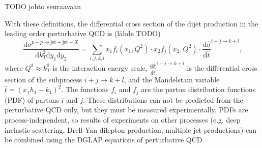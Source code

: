 \documentclass[a4paper, twoside, english, 12pt]{article}
\begin{document}
TODO johto seuraavaan

With these definitions, the differential cross section of the dijet production in the leading order perturbative QCD is (lähde TODO)
\begin{equation}\label{E:dijet_cross_section}
\frac{\text{d}\sigma^{p+p\rightarrow\text{jet}+\text{jet}+X}}{\text{d}k_T^2\text{d}y_1\text{d}y_2} = \sum_{i,j,k,l} x_1f_i(x_1,Q^2)\cdot x_2f_j(x_2,Q^2) \cdot\frac{\text{d}\hat{\sigma}}{\text{d}\hat{t}}^{i+j\rightarrow k+l},
\end{equation}
where $Q^2\approx k_T^2$ is the interaction energy scale, $\frac{\text{d}\hat{\sigma}}{\text{d}\hat{t}}^{i+j\rightarrow k+l}$ is the differential cross section of the subprocess $i+j\rightarrow k+l$, and the Mandelstam variable $\hat{t} = (x_1h_1-k_1)^2$. The functions $f_i$ and $f_j$ are the parton distribution functions (PDF) of partons $i$ and $j$. These distributions can not be predicted from the perturbative QCD only, but they must be measured experimentally. PDFs are process-independent, so results of experiments on other processes (e.g. deep inelastic scattering, Drell-Yan dilepton production, multiple jet productions) can be combined using the DGLAP equations of perturbative QCD.
\end{document}
